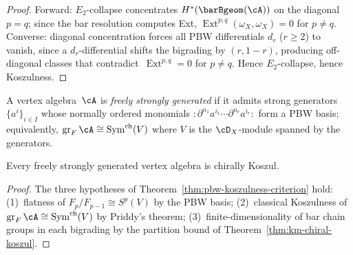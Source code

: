 \begin{proof}
Forward: $E_2$-collapse concentrates $H^*(\barBgeom(\cA))$ on
the diagonal $p = q$; since the bar resolution computes Ext,
$\operatorname{Ext}^{p,q}(\omega_X, \omega_X) = 0$ for
$p \neq q$.
Converse: diagonal concentration forces all PBW differentials
$d_r$ ($r \geq 2$) to vanish, since a $d_r$-differential shifts
the bigrading by $(r, 1-r)$, producing off-diagonal classes
that contradict~$\operatorname{Ext}^{p,q} = 0$ for $p \neq q$.
Hence $E_2$-collapse, hence Koszulness.
\end{proof}

\begin{proposition}
\label{prop:pbw-universality}

A vertex algebra~$\cA$ is \emph{freely strongly generated} if it
admits strong generators $\{a^i\}_{i \in I}$ whose normally ordered
monomials
$:\!\partial^{n_1} a^{i_1} \cdots \partial^{n_r} a^{i_r}\!:$
form a PBW basis; equivalently,
$\operatorname{gr}_F \cA \cong \operatorname{Sym}^{\mathrm{ch}}(V)$
where $V$ is the $\cD_X$-module spanned by the generators.

Every freely strongly generated vertex algebra is chirally Koszul.
\end{proposition}

\begin{proof}
The three hypotheses of Theorem~\ref{thm:pbw-koszulness-criterion}
hold: (1)~flatness of $F_p/F_{p-1} \cong S^p(V)$ by the PBW basis;
(2)~classical Koszulness of $\operatorname{gr}_F \cA \cong
\operatorname{Sym}^{\mathrm{ch}}(V)$ by Priddy's theorem;
(3)~finite-dimensionality of bar chain groups in each bigrading by
the partition bound of Theorem~\ref{thm:km-chiral-koszul}.
\end{proof}

